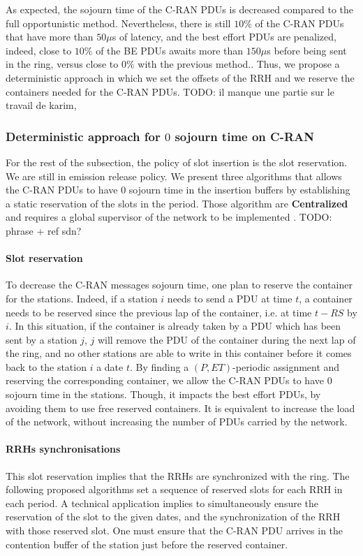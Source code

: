 \documentclass[a4paper,10pt,english]{article}
\newcommand{\todo}[1]{{\color{red} TODO: {#1}}}
\begin{document}
  As expected, the sojourn time of the C-RAN PDUs is decreased compared to the full opportunistic method. Nevertheless, there is still $10\%$ of the C-RAN PDUs that have more than $50 \mu$s of latency, and the best effort PDUs are penalized, indeed, close to $10\%$ of the BE PDUs awaits more than $150\mu$s before being sent in the ring, versus close to $0\%$ with the previous method..
  Thus, we propose a deterministic approach in which we set the offsets of the RRH and we reserve the containers needed for the C-RAN PDUs.
   \todo{il manque une partie sur le travail de karim, }
  \subsubsection{Deterministic approach for $0$ sojourn time on C-RAN}
\label{sec:deterministicalgorithms}

 For the rest of the subsection, the policy of slot insertion is the slot reservation. We are still in emission release policy. We present three algorithms that allows the C-RAN PDUs to have $0$ sojourn time in the insertion buffers by establishing a static reservation of the slots in the period.
 Those algorithm are {\bf Centralized} and requires a global supervisor of the network to be implemented .\todo{phrase + ref sdn?}
 
\paragraph{Slot reservation} To decrease the C-RAN messages sojourn time, one plan to reserve the container for the stations. Indeed, if a station $i$ needs to send a PDU at time $t$, a container needs to be reserved since the previous lap of the container, i.e. at time $t - RS$ by $i$. In this situation, if the container is already taken by a PDU which has been sent by a station $j$, $j$ will remove the PDU of the container during the next lap of the ring, and no other stations are able to write in this container before it comes back to the station $i$ a date $t$. By finding a $(P,ET)$-periodic assignment and reserving the corresponding container, we allow the C-RAN PDUs to have $0$ sojourn time in the stations. Though, it impacts the best effort PDUs, by avoiding them to use free reserved containers. It is equivalent to increase the load of the network, without increasing the number of PDUs carried by the network. 

\paragraph{RRHs synchronisations}
This slot reservation implies that the RRHs are synchronized with the ring. The following proposed algorithms set a sequence of reserved slots for each RRH in each period. A technical application implies to simultaneously ensure the reservation of the slot to the given dates, and the synchronization of the RRH with those reserved slot. One must ensure that the C-RAN PDU arrives in the contention buffer of the station just before the reserved container.
\end{document}
